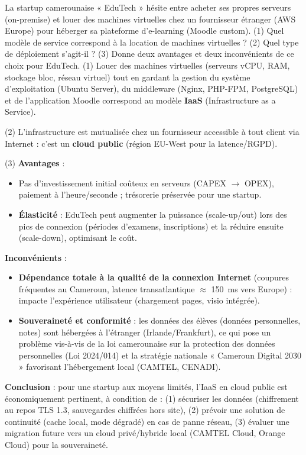 \documentclass[11pt]{article}
\begin{document}
\begin{exoresolu}
La startup camerounaise « EduTech » hésite entre acheter ses propres serveurs (on-premise) et louer des machines virtuelles chez un fournisseur étranger (AWS Europe) pour héberger sa plateforme d'e-learning (Moodle custom). 
(1) Quel modèle de service correspond à la location de machines virtuelles ? 
(2) Quel type de déploiement s'agit-il ? 
(3) Donne deux avantages et deux inconvénients de ce choix pour EduTech.
\tcblower
(1) Louer des machines virtuelles (serveurs vCPU, RAM, stockage bloc, réseau virtuel) tout en gardant la gestion du système d'exploitation (Ubuntu Server), du middleware (Nginx, PHP-FPM, PostgreSQL) et de l'application Moodle correspond au modèle \textbf{IaaS} (Infrastructure as a Service).

(2) L'infrastructure est mutualisée chez un fournisseur accessible à tout client via Internet : c'est un \textbf{cloud public} (région EU-West pour la latence/RGPD).

(3) \textbf{Avantages} :
\begin{itemize}
\item Pas d'investissement initial coûteux en serveurs (CAPEX $\to$ OPEX), paiement à l'heure/seconde ; trésorerie préservée pour une startup.
\item \textbf{Élasticité} : EduTech peut augmenter la puissance (scale-up/out) lors des pics de connexion (périodes d'examens, inscriptions) et la réduire ensuite (scale-down), optimisant le coût.
\end{itemize}
\textbf{Inconvénients} :
\begin{itemize}
\item \textbf{Dépendance totale à la qualité de la connexion Internet} (coupures fréquentes au Cameroun, latence transatlantique $\approx$ \SI{150}{ms} vers Europe) : impacte l'expérience utilisateur (chargement pages, visio intégrée).
\item \textbf{Souveraineté et conformité} : les données des élèves (données personnelles, notes) sont hébergées à l'étranger (Irlande/Frankfurt), ce qui pose un problème vis-à-vis de la loi camerounaise sur la protection des données personnelles (Loi 2024/014) et la stratégie nationale « Cameroun Digital 2030 » favorisant l'hébergement local (CAMTEL, CENADI).
\end{itemize}
\textbf{Conclusion} : pour une startup aux moyens limités, l'IaaS en cloud public est économiquement pertinent, à condition de : (1) sécuriser les données (chiffrement au repos TLS 1.3, sauvegardes chiffrées hors site), (2) prévoir une solution de continuité (cache local, mode dégradé) en cas de panne réseau, (3) évaluer une migration future vers un cloud privé/hybride local (CAMTEL Cloud, Orange Cloud) pour la souveraineté.
\end{exoresolu}
\end{document}
